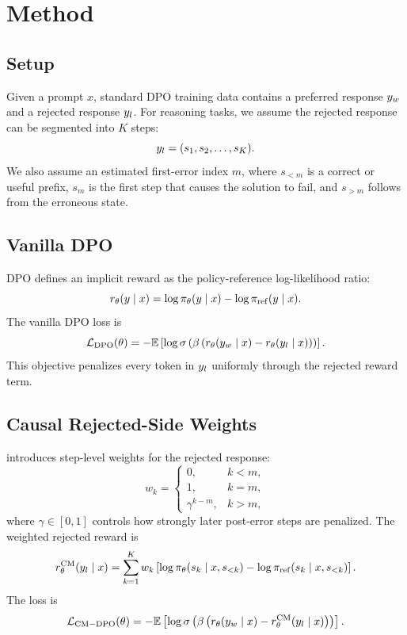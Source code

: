 \section{Method}

\subsection{Setup}

Given a prompt $x$, standard DPO training data contains a preferred response $y_w$ and a rejected response $y_l$. For reasoning tasks, we assume the rejected response can be segmented into $K$ steps:
\begin{equation}
y_l = (s_1, s_2, \ldots, s_K).
\end{equation}
We also assume an estimated first-error index $m$, where $s_{<m}$ is a correct or useful prefix, $s_m$ is the first step that causes the solution to fail, and $s_{>m}$ follows from the erroneous state.

\subsection{Vanilla DPO}

DPO defines an implicit reward as the policy-reference log-likelihood ratio:
\begin{equation}
r_\theta(y \mid x)
= \log \pi_\theta(y \mid x) - \log \pi_{\mathrm{ref}}(y \mid x).
\end{equation}
The vanilla DPO loss is
\begin{equation}
\mathcal{L}_{\mathrm{DPO}}(\theta)
=
- \mathbb{E}
\left[
\log \sigma
\left(
\beta
\left(
r_\theta(y_w \mid x)
-
r_\theta(y_l \mid x)
\right)
\right)
\right].
\end{equation}
This objective penalizes every token in $y_l$ uniformly through the rejected reward term.

\subsection{Causal Rejected-Side Weights}

\cmdpo introduces step-level weights for the rejected response:
\begin{equation}
w_k =
\begin{cases}
0, & k < m, \\
1, & k = m, \\
\gamma^{k-m}, & k > m,
\end{cases}
\end{equation}
where $\gamma \in [0,1]$ controls how strongly later post-error steps are penalized. The weighted rejected reward is
\begin{equation}
r_\theta^{\mathrm{CM}}(y_l \mid x)
=
\sum_{k=1}^{K}
w_k
\left[
\log \pi_\theta(s_k \mid x, s_{<k})
-
\log \pi_{\mathrm{ref}}(s_k \mid x, s_{<k})
\right].
\end{equation}
The \cmdpo loss is
\begin{equation}
\mathcal{L}_{\mathrm{CM-DPO}}(\theta)
=
- \mathbb{E}
\left[
\log \sigma
\left(
\beta
\left(
r_\theta(y_w \mid x)
-
r_\theta^{\mathrm{CM}}(y_l \mid x)
\right)
\right)
\right].
\end{equation}

